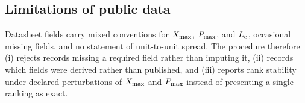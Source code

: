 \subsection{Limitations of public data}
\label{sec:scope-datalimits}

Datasheet fields carry mixed conventions for $X_{\mathrm{max}}$, $P_{\mathrm{max}}$, and $L_{\mathrm{e}}$,
occasional missing fields, and no statement of unit-to-unit spread. The
procedure therefore (i) rejects records missing a required field rather
than imputing it, (ii) records which fields were derived rather than
published, and (iii) reports rank stability under declared perturbations of
$X_{\mathrm{max}}$ and $P_{\mathrm{max}}$ instead of presenting a single ranking as exact.
